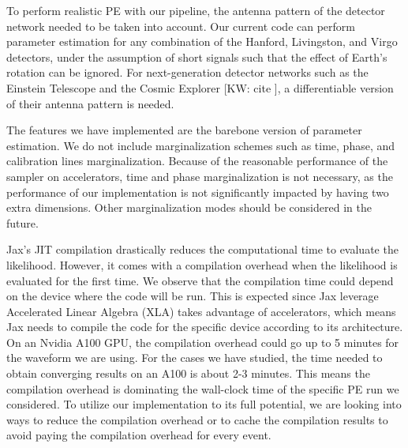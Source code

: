\documentclass[twocolumn]{aastex631}
\newcommand{\kw}[1]{{\color{rb4}[KW: #1 ]}}
\begin{document}

To perform realistic PE with our pipeline, the antenna pattern of the
detector network needed to be taken into account. Our current code can perform
parameter estimation for any combination of the Hanford, Livingston, and Virgo
detectors, under the assumption of short signals such that the effect of Earth's
rotation can be ignored. For next-generation detector networks such as the
Einstein Telescope and the Cosmic Explorer \kw{cite}, a differentiable version
of their antenna pattern is needed.

The features we have implemented are the barebone version of parameter
estimation. We do not include marginalization schemes such as time, phase, and
calibration lines marginalization. Because of the reasonable performance of the sampler on
accelerators, time and phase marginalization is not necessary, as the
performance of our implementation is not significantly impacted by having two
extra dimensions. Other marginalization modes should be considered in the future.

Jax's JIT compilation drastically reduces the computational time to evaluate the
likelihood. However, it comes with a compilation overhead when the likelihood is
evaluated for the first time. We observe that the compilation time could depend
on the device where the code will be run. This is expected since Jax leverage
Accelerated Linear Algebra (XLA) takes advantage of accelerators, which means
Jax needs to compile the code for the specific device according to its
architecture. On an Nvidia A100 GPU, the compilation overhead could go up to 5
minutes for the waveform we are using. For the cases we have studied, the time
needed to obtain converging results on an A100 is about 2-3 minutes. This means
the compilation overhead is dominating the wall-clock time of the specific PE
run we considered. To utilize our implementation to its full potential, we are
looking into ways to reduce the compilation overhead or to cache the
compilation results to avoid paying the compilation overhead for every event.

\end{document}
